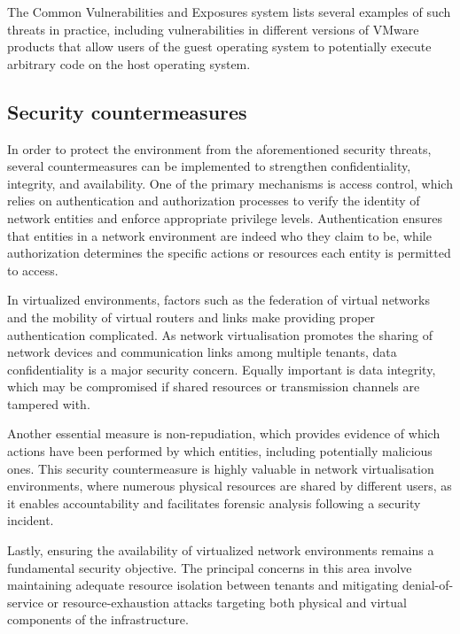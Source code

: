 The Common Vulnerabilities and Exposures system lists several examples of such threats in practice, including vulnerabilities in different versions of VMware products that allow users of the guest operating system to potentially execute arbitrary code on the host operating system.

\subsection{Security countermeasures}

In order to protect the environment from the aforementioned security threats, several countermeasures can be implemented to strengthen confidentiality, integrity, and availability. One of the primary mechanisms is access control, which relies on authentication and authorization processes to verify the identity of network entities and enforce appropriate privilege levels. Authentication ensures that entities in a network environment are indeed who they claim to be, while authorization determines the specific actions or resources each entity is permitted to access. 

In virtualized environments, factors such as the federation of virtual networks and the mobility of virtual routers and links make providing proper authentication complicated. As network virtualisation promotes the sharing of network devices and communication links among multiple tenants, data confidentiality is a major security concern. Equally important is data integrity, which may be compromised if shared resources or transmission channels are tampered with. 

Another essential measure is non-repudiation, which provides evidence of which actions have been performed by which entities, including potentially malicious ones. This security countermeasure is highly valuable in network virtualisation environments, where numerous physical resources are shared by different users, as it enables accountability and facilitates forensic analysis following a security incident. 

Lastly, ensuring the availability of virtualized network environments remains a fundamental security objective. The principal concerns in this area involve maintaining adequate resource isolation between tenants and mitigating denial-of-service or resource-exhaustion attacks targeting both physical and virtual components of the infrastructure.